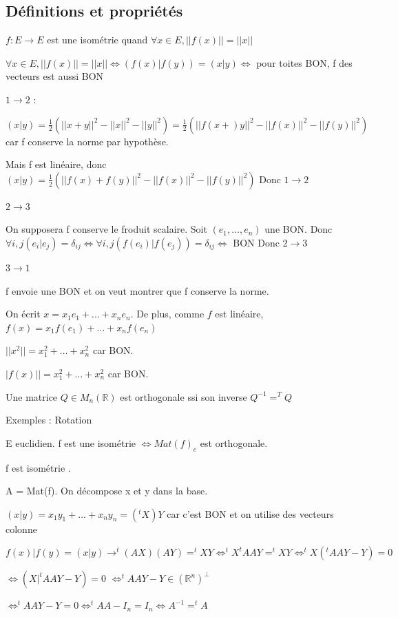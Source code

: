 \documentclass[french]{yLectureNote}
\newcommand{\R}[0]{\mathbb{R}}
\begin{document}
\subsection{Définitions et propriétés}
\begin{definition}[Isométrie]
    $f : E\to E$ est une isométrie quand $\forall x\in E, ||f(x)|| = ||x||$
\end{definition}
\begin{proposition}
    $\forall x \in E, ||f(x)||  = ||x|| \iff (f(x)|f(y)) = (x|y) \iff $ pour toites BON, f des vecteurs est
    aussi BON
\end{proposition}
\begin{myproof}
    $1\rightarrow 2$ :

    $(x|y) = \frac12 (||x+y||^2-||x||^2-||y||^2) = \frac12 (||f(x+)y||^2-||f(x)||^2-||f(y)||^2)$
    car f conserve la norme par hypothèse.

    Mais f est linéaire, donc $(x|y) =\frac12 (||f(x)+f(y)||^2-||f(x)||^2-||f(y)||^2)$
    Donc $1\rightarrow 2$ 

    $2\rightarrow 3$ 

    On supposera f conserve le froduit scalaire. Soit $(e_1,\dots, e_n)$ une BON.
    Donc $\forall i,j (e_i|e_j)=\delta_{ij}\iff \forall i,j (f(e_i)|f(e_j))=\delta_{ij}\iff $ BON
    Donc $2\rightarrow 3$ 

    $3\rightarrow 1$ 

    f envoie une BON et on veut montrer que f conserve la norme.

    On écrit $x=x_1e_1+\dots+x_ne_n$. De plus, comme $f$ est linéaire, $f(x) = x_1f(e_1)+\dots+x_nf(e_n)$

    $||x^2|| =  x_1^2+\dots+x_n^2$ car BON.
    
    $|f(x)|| =  x_1^2+\dots+x_n^2$ car BON.
\end{myproof}
\begin{definition}
    Une matrice $Q\in M_n(\R)$ est orthogonale ssi son inverse $Q^{-1} = ^TQ$
\end{definition}
Exemples : Rotation
\begin{proposition}
    E euclidien. f est une isométrie $\iff Mat(f)_e$ est orthogonale.
\end{proposition}
\begin{myproof}
    f est isométrie .

    A = Mat(f). On décompose x et y dans la base.

    $(x|y) = x_1y_1+\dots+x_ny_n = (^tX)Y$ car c'est BON et on utilise des vecteurs colonne

    $f(x)|f(y) = (x|y) \rightarrow ^t(AX)(AY) = ^tXY \iff ^tX^tAAY = ^tXY \iff  ^tX(^tAAY-Y) = 0$ 
    
    $\iff (X|^tAAY-Y) = 0 $
    $\iff ^tAAY-Y \in (\R^n)^{\perp}$

    $ \iff ^tAAY-Y = 0 \iff ^tAA-I_n = I_n \iff A^{-1}  = ^tA$


\end{myproof}
\end{document}
